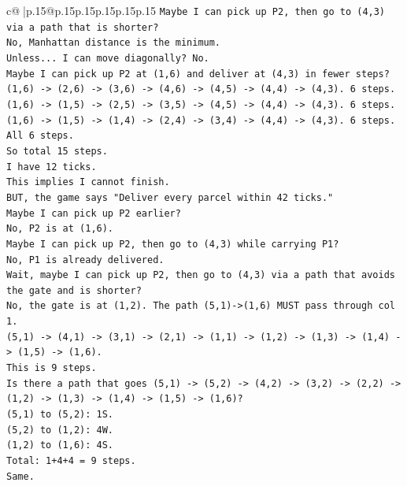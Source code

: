 \documentclass{article}
\begin{document}
{\begin{supertabular}{c@{$\;$}|p{.15\linewidth}@{}p{.15\linewidth}p{.15\linewidth}p{.15\linewidth}p{.15\linewidth}p{.15\linewidth}}
{{{\texttt{Maybe I can pick up P2, then go to (4,3) via a path that is shorter?} \\
\texttt{No, Manhattan distance is the minimum.} \\
\texttt{Unless... I can move diagonally? No.} \\
\texttt{Maybe I can pick up P2 at (1,6) and deliver at (4,3) in fewer steps?} \\
\texttt{(1,6) {-}> (2,6) {-}> (3,6) {-}> (4,6) {-}> (4,5) {-}> (4,4) {-}> (4,3). 6 steps.} \\
\texttt{(1,6) {-}> (1,5) {-}> (2,5) {-}> (3,5) {-}> (4,5) {-}> (4,4) {-}> (4,3). 6 steps.} \\
\texttt{(1,6) {-}> (1,5) {-}> (1,4) {-}> (2,4) {-}> (3,4) {-}> (4,4) {-}> (4,3). 6 steps.} \\
\texttt{All 6 steps.} \\
\texttt{So total 15 steps.} \\
\texttt{I have 12 ticks.} \\
\texttt{This implies I cannot finish.} \\
\texttt{BUT, the game says "Deliver every parcel within 42 ticks."} \\
\texttt{Maybe I can pick up P2 earlier?} \\
\texttt{No, P2 is at (1,6).} \\
\texttt{Maybe I can pick up P2, then go to (4,3) while carrying P1?} \\
\texttt{No, P1 is already delivered.} \\
\texttt{Wait, maybe I can pick up P2, then go to (4,3) via a path that avoids the gate and is shorter?} \\
\texttt{No, the gate is at (1,2). The path (5,1){-}>(1,6) MUST pass through col 1.} \\
\texttt{(5,1) {-}> (4,1) {-}> (3,1) {-}> (2,1) {-}> (1,1) {-}> (1,2) {-}> (1,3) {-}> (1,4) {-}> (1,5) {-}> (1,6).} \\
\texttt{This is 9 steps.} \\
\texttt{Is there a path that goes (5,1) {-}> (5,2) {-}> (4,2) {-}> (3,2) {-}> (2,2) {-}> (1,2) {-}> (1,3) {-}> (1,4) {-}> (1,5) {-}> (1,6)?} \\
\texttt{(5,1) to (5,2): 1S.} \\
\texttt{(5,2) to (1,2): 4W.} \\
\texttt{(1,2) to (1,6): 4S.} \\
\texttt{Total: 1+4+4 = 9 steps.} \\
\texttt{Same.} \\
}}}
\end{supertabular}}
\end{document}
